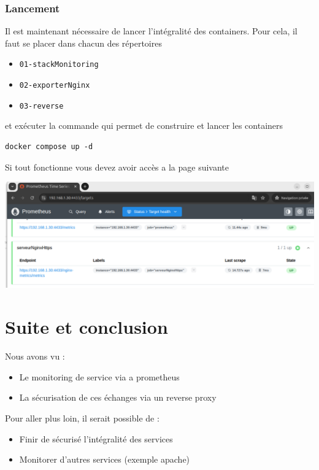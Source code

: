 \documentclass[french, 12pt]{article}%
\newcommand{\itemE}{\item[$\bullet$]}
\begin{document}
\subsubsection{Lancement}

Il est maintenant nécessaire de lancer l'intégralité des containers. Pour cela, il faut se placer dans chacun des répertoires 
\begin{itemize}
\itemE \verb?01-stackMonitoring?
\itemE \verb?02-exporterNginx?
\itemE \verb?03-reverse?
\end{itemize}
et exécuter la commande qui permet de construire et lancer les containers 

\begin{lstlisting}[style=commande]
docker compose up -d
\end{lstlisting}

Si tout fonctionne vous devez avoir accès a la page suivante 

\begin{center}
\includegraphics[scale=0.6]{./ressource/finalPromHTTPS}
\end{center}



\section{Suite et conclusion}

Nous avons vu : 
\begin{itemize}
\itemE Le monitoring de service via a prometheus
\itemE La sécurisation de ces échanges via un reverse proxy 
\end{itemize}

\vspace{0.5cm}

Pour aller plus loin, il serait possible de : 
\begin{itemize}
\itemE Finir de sécurisé l'intégralité des services
\itemE Monitorer d'autres services (exemple apache)
\end{itemize}
\end{document}
